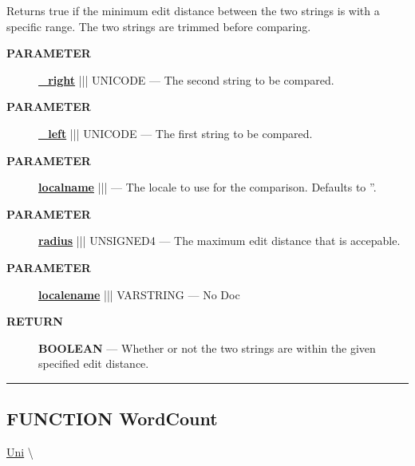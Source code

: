 \par





Returns true if the minimum edit distance between the two strings is with a specific range. The two strings are trimmed before comparing.






\par
\begin{description}
\item [\colorbox{tagtype}{\color{white} \textbf{\textsf{PARAMETER}}}] \textbf{\underline{\_right}} ||| UNICODE --- The second string to be compared.
\item [\colorbox{tagtype}{\color{white} \textbf{\textsf{PARAMETER}}}] \textbf{\underline{\_left}} ||| UNICODE --- The first string to be compared.
\item [\colorbox{tagtype}{\color{white} \textbf{\textsf{PARAMETER}}}] \textbf{\underline{localname}} |||  --- The locale to use for the comparison. Defaults to ''.
\item [\colorbox{tagtype}{\color{white} \textbf{\textsf{PARAMETER}}}] \textbf{\underline{radius}} ||| UNSIGNED4 --- The maximum edit distance that is accepable.
\item [\colorbox{tagtype}{\color{white} \textbf{\textsf{PARAMETER}}}] \textbf{\underline{localename}} ||| VARSTRING --- No Doc
\end{description}







\par
\begin{description}
\item [\colorbox{tagtype}{\color{white} \textbf{\textsf{RETURN}}}] \textbf{BOOLEAN} --- Whether or not the two strings are within the given specified edit distance.
\end{description}




\rule{\linewidth}{0.5pt}
\subsection*{\textsf{\colorbox{headtoc}{\color{white} FUNCTION}
WordCount}}

\hypertarget{ecldoc:uni.wordcount}{}
\hspace{0pt} \hyperlink{ecldoc:Uni}{Uni} \textbackslash 

